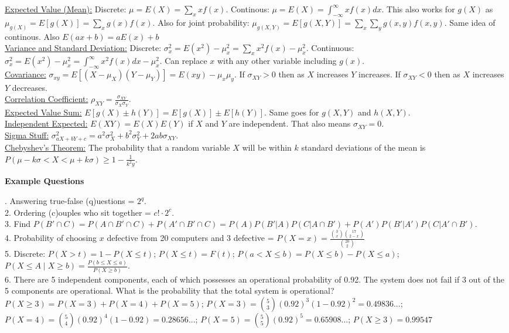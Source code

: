 \documentclass[9pt]{article}
\begin{document}
        \begin{multicols}{2}
            \noindent\underline{Expected Value (Mean):} Discrete: $\mu=E(X) = \sum_xxf(x)$. Continous: $\mu=E(X)=\int_{-\infty}^{\infty}xf(x)dx$. This also works for $g(X)$ as $\mu_{g(X)} = E[g(X)] = \sum_xg(x)f(x)$. Also for joint probability: $\mu_{g(X,Y)}=E[g(X,Y)]=\sum_x\sum_yg(x,y)f(x,y)$. Same idea of continous. Also $E(ax+b) = aE(x)+b$\\
            \underline{Variance and Standard Deviation:} Discrete: $\sigma_x^2=E(x^2)-\mu_x^2=\sum_xx^2f(x)-\mu_x^2$. Continuous: $\sigma_x^2=E(x^2)-\mu_x^2=\int_{-\infty}^{\infty}x^2f(x)dx-\mu_x^2$. Can replace $x$ with any other variable including $g(x)$.\\
            \underline{Covariance:} $\sigma_{xy} = E[(X-\mu_X)(Y-\mu_Y)]=E(xy)-\mu_x\mu_y$. If $\sigma_{XY}>0$ then as $X$ increases $Y$ increases. If $\sigma_{XY}<0$ then as $X$ increases $Y$ decreases.\\
            \underline{Correlation Coefficient:} $\rho_{XY}=\frac{\sigma_{XY}}{\sigma_X\sigma_Y}$.\\
            \underline{Expected Value Sum:} $E[g(X)\pm h(Y)] = E[g(X)]\pm E[h(Y)]$. Same goes for $g(X,Y)$ and $h(X,Y)$.\\
            \underline{Independent Expected:} $E(XY) = E(X)E(Y)$ if $X$ and $Y$ are independent. That also means $\sigma_{XY}=0$.\\
            \underline{Sigma Stuff:} $\sigma_{aX+bY+c}^{2}=a^2\sigma_X^2+b^2\sigma_Y^2+2ab\sigma_{XY}$.\\
            \underline{Chebyshev's Theorem:} The probability that a random variable $X$ will be within $k$ standard deviations of the mean is $P(\mu - k\sigma<X<\mu +k\sigma)\geq 1 - \frac{1}{k^2y}$.
        \end{multicols}
    \noindent\textbf{Example Questions} 
        \begin{multicols}{2}
            . Answering true-false (q)uestions = $2^{q}$.\\
            2. Ordering (c)ouples who sit together = $c!\cdot 2^c$.\\
            3. Find $P(B'\cap C) = P(A\cap B'\cap C)+P(A'\cap B'\cap C) = P(A)P(B'|A)P(C|A\cap B') + P(A')P(B'|A')P(C|A'\cap B')$.\\
            4. Probability of choosing $x$ defective from 20 computers and 3 defective = $P(X = x) = \frac{\binom{3}{x}\binom{17}{2-x}}{\binom{20}{2}}$\\
            5. Discrete: $P(X>t)=1-P(X\leq t)$; $P(X\leq t)=F(t)$; $P(a<X\leq b)=P(X\leq b)-P(X\leq a)$; $P(X\leq A\mid X\geq b) = \frac{P(b\leq X\leq a)}{P(X\geq b)}$.\\
            6. There are 5 independent components, each of which possesses an operational probability of 0.92. The system does not fail if 3 out of the 5 components are operational. What is the probability that the total system is operational?
            $P(X\geq 3)=P(X=3)+P(X=4)+P(X=5)$; $P(X=3) = \binom{5}{3}(0.92)^3(1-0.92)^2 = 0.49836...$;
            $P(X=4) = \binom{5}{4}(0.92)^4(1-0.92) = 0.28656...$;
            $P(X=5) = \binom{5}{5}(0.92)^5 = 0.65908...$;
            $P(X\geq 3)=0.99547$
        \end{multicols}
\end{document}
